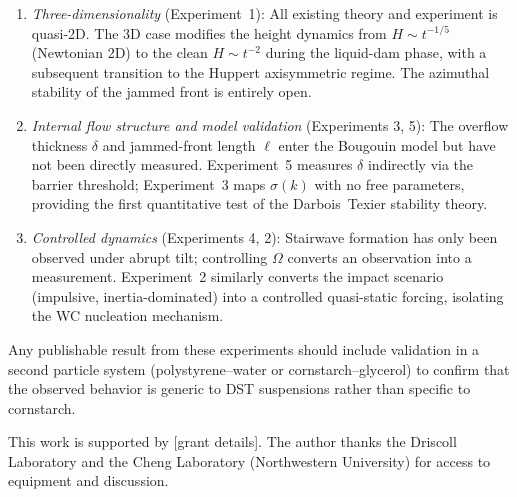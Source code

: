 \documentclass[aps,preprint,superscriptaddress,longbibliography]{revtex4-2}
\begin{document}
\begin{enumerate}[leftmargin=1.5em, label=(\roman*)]

\item \textit{Three-dimensionality} (Experiment~1):
All existing theory and experiment is quasi-2D.  The 3D case modifies the
height dynamics from $H \sim t^{-1/5}$ (Newtonian 2D) to the clean $H \sim t^{-2}$
during the liquid-dam phase, with a subsequent transition to the Huppert
axisymmetric regime.  The azimuthal stability of the jammed front is entirely
open.

\item \textit{Internal flow structure and model validation}
(Experiments 3, 5):
The overflow thickness $\delta$ and jammed-front length $\ell$ enter the
Bougouin model but have not been directly measured.  Experiment~5 measures
$\delta$ indirectly via the barrier threshold; Experiment~3 maps $\sigma(k)$
with no free parameters, providing the first quantitative test of the
Darbois~Texier stability theory.

\item \textit{Controlled dynamics} (Experiments 4, 2):
Stairwave formation has only been observed under abrupt tilt; controlling $\Omega$
converts an observation into a measurement.  Experiment~2 similarly converts the
impact scenario (impulsive, inertia-dominated) into a controlled quasi-static
forcing, isolating the WC nucleation mechanism.

\end{enumerate}

Any publishable result from these experiments should include validation in a
second particle system (polystyrene--water or cornstarch--glycerol) to confirm
that the observed behavior is generic to DST suspensions rather than specific
to cornstarch.

\begin{acknowledgments}
This work is supported by [grant details].  The author thanks the Driscoll
Laboratory and the Cheng Laboratory (Northwestern University) for access to
equipment and discussion.
\end{acknowledgments}
\end{document}
